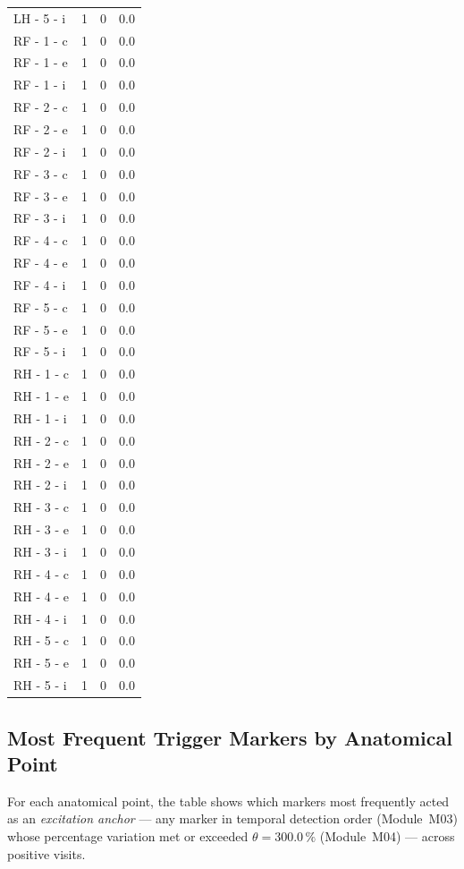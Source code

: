 \documentclass[a4paper,11pt]{article}
\begin{document}
\begin{small}
\begin{longtable}{p{5cm}rrr}
LH - 5 - i & 1 & 0 & 0.0 \\
RF - 1 - c & 1 & 0 & 0.0 \\
RF - 1 - e & 1 & 0 & 0.0 \\
RF - 1 - i & 1 & 0 & 0.0 \\
RF - 2 - c & 1 & 0 & 0.0 \\
RF - 2 - e & 1 & 0 & 0.0 \\
RF - 2 - i & 1 & 0 & 0.0 \\
RF - 3 - c & 1 & 0 & 0.0 \\
RF - 3 - e & 1 & 0 & 0.0 \\
RF - 3 - i & 1 & 0 & 0.0 \\
RF - 4 - c & 1 & 0 & 0.0 \\
RF - 4 - e & 1 & 0 & 0.0 \\
RF - 4 - i & 1 & 0 & 0.0 \\
RF - 5 - c & 1 & 0 & 0.0 \\
RF - 5 - e & 1 & 0 & 0.0 \\
RF - 5 - i & 1 & 0 & 0.0 \\
RH - 1 - c & 1 & 0 & 0.0 \\
RH - 1 - e & 1 & 0 & 0.0 \\
RH - 1 - i & 1 & 0 & 0.0 \\
RH - 2 - c & 1 & 0 & 0.0 \\
RH - 2 - e & 1 & 0 & 0.0 \\
RH - 2 - i & 1 & 0 & 0.0 \\
RH - 3 - c & 1 & 0 & 0.0 \\
RH - 3 - e & 1 & 0 & 0.0 \\
RH - 3 - i & 1 & 0 & 0.0 \\
RH - 4 - c & 1 & 0 & 0.0 \\
RH - 4 - e & 1 & 0 & 0.0 \\
RH - 4 - i & 1 & 0 & 0.0 \\
RH - 5 - c & 1 & 0 & 0.0 \\
RH - 5 - e & 1 & 0 & 0.0 \\
RH - 5 - i & 1 & 0 & 0.0 \\
\end{longtable}
\end{small}

\subsection{Most Frequent Trigger Markers by Anatomical Point}

For each anatomical point, the table shows which markers most frequently acted as an
\emph{excitation anchor} --- any marker in temporal detection order (Module~M03)
whose percentage variation met or exceeded $\theta = 300.0\,\%$
(Module~M04) --- across positive visits.
\end{document}
